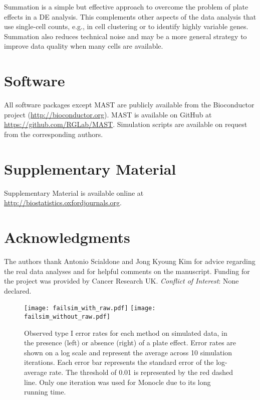 \documentclass[oupdraft]{bio}
\begin{document}
Summation is a simple but effective approach to overcome the problem of plate effects in a DE analysis. 
This complements other aspects of the data analysis that use single-cell counts, e.g., in cell clustering or to identify highly variable genes.
Summation also reduces technical noise and may be a more general strategy to improve data quality when many cells are available.

\section{Software}
\label{sec5}
All software packages except MAST are publicly available from the Bioconductor project (\url{http://bioconductor.org}).
MAST is available on GitHub at \url{https://github.com/RGLab/MAST}.
Simulation scripts are available on request from the corresponding authors.

\section{Supplementary Material}
Supplementary Material is available online at \href{http://biostatistics.oxfordjournals.org}{http://biostatistics.oxfordjournals.org}.

\section*{Acknowledgments}
The authors thank Antonio Scialdone and Jong Kyoung Kim for advice regarding the real data analyses and for helpful comments on the manuscript.
Funding for the project was provided by Cancer Research UK.
{\it Conflict of Interest}: None declared.




\begin{figure}[!p]
\begin{center}
\texttt{[image: failsim\_with\_raw.pdf]}
\texttt{[image: failsim\_without\_raw.pdf]}
\end{center}
\caption{
    Observed type I error rates for each method on simulated data, in the presence (left) or absence (right) of a plate effect.
    Error rates are shown on a log scale and represent the average across 10 simulation iterations.
    Each error bar represents the standard error of the log-average rate.
    The threshold of 0.01 is represented by the red dashed line.
    Only one iteration was used for Monocle due to its long running time.
}
\label{fig:platefail}
\end{figure}
\end{document}

